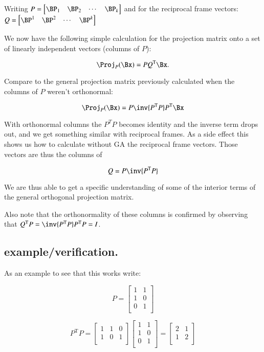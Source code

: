 \documentclass{article}      %
\newcommand{\T}[0]{\text{T}}
\begin{document}
Writing 
$P = 
\begin{bmatrix}
\BP_1 & \BP_2 & \cdots & \BP_k
\end{bmatrix}
$
and for the reciprocal frame vectors:
$Q = 
\begin{bmatrix}
\BP^1 & \BP^2 & \cdots & \BP^k
\end{bmatrix}
$

We now have the following simple calculation for the projection matrix onto a set of linearly independent vectors (columns of $P$):

\begin{equation}
\Proj_P(\Bx) = P Q^\T \Bx.
\end{equation}

Compare to the general projection matrix previously calculated when the columns of $P$ weren't orthonormal:

\begin{equation}
\Proj_P(\Bx) = P \inv{P^\T P} P^\T \Bx
\end{equation}

With orthonormal columns the $P^T P$ becomes identity and the inverse term drops out, and we get something similar with reciprocal frames.  As a side effect this shows us how to calculate without GA the reciprocal frame vectors.  Those vectors
are thus the columns of

\begin{equation}
Q = P \inv{P^\T P}
\end{equation}

We are thus able to get a specific understanding of some of the interior terms of the general orthogonal projection matrix.

Also note that the orthonormality of these columns is confirmed by observing that $Q^\T P = \inv{P^\T P} P^\T P = I$.

\subsection{ example/verification. }

As an example to see that this works write:

\[
P = 
\begin{bmatrix}
1 & 1 \\
1 & 0 \\
0 & 1 \\
\end{bmatrix}
\]

\[
P^\T P = 
\begin{bmatrix}
1 & 1 & 0 \\
1 & 0 & 1 \\
\end{bmatrix}
\begin{bmatrix}
1 & 1 \\
1 & 0 \\
0 & 1 \\
\end{bmatrix}
=
\begin{bmatrix}
2 & 1 \\
1 & 2 \\
\end{bmatrix}
\]
\end{document}
